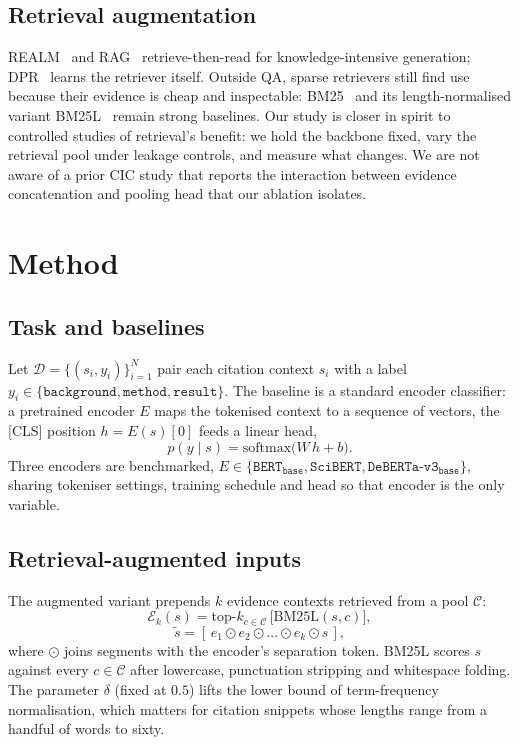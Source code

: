 \documentclass[10pt,twocolumn,twoside]{article}
\begin{document}
\subsection{Retrieval augmentation}
REALM~\cite{guu2020} and RAG~\cite{lewis2020} retrieve-then-read for
knowledge-intensive generation; DPR~\cite{karpukhin2020} learns the retriever
itself. Outside QA, sparse retrievers still find use because their evidence is
cheap and inspectable: BM25~\cite{robertson2009} and its length-normalised
variant BM25L~\cite{lv2011} remain strong baselines. Our study is closer in
spirit to controlled studies of retrieval's benefit: we hold the backbone
fixed, vary the retrieval pool under leakage controls, and measure what
changes. We are not aware of a prior CIC study that reports the interaction
between evidence concatenation and pooling head that our ablation isolates.

\section{Method}\label{sec:method}

\subsection{Task and baselines}\label{sec:task}
Let $\mathcal{D}=\{(s_i,y_i)\}_{i=1}^{N}$ pair each citation context $s_i$
with a label $y_i\in\{\texttt{background},\texttt{method},\texttt{result}\}$.
The baseline is a standard encoder classifier: a pretrained encoder $E$ maps
the tokenised context to a sequence of vectors, the \mbox{[CLS]} position
$h=E(s)[0]$ feeds a linear head,
\begin{equation}\label{eq:baseline}
p(y\mid s)=\mathrm{softmax}\big(W\,h+b\big).
\end{equation}
Three encoders are benchmarked, $E\in\{\texttt{BERT}_{\texttt{base}},
\texttt{SciBERT},\texttt{DeBERTa-v3}_{\texttt{base}}\}$, sharing tokeniser
settings, training schedule and head so that encoder is the only variable.

\subsection{Retrieval-augmented inputs}\label{sec:real}
The augmented variant prepends $k$ evidence contexts retrieved from a pool
$\mathcal{C}$:
\begin{equation}\label{eq:retrieve}
\mathcal{E}_k(s)=\mathrm{top}\text{-}k_{c\in\mathcal{C}}\,
\big[\mathrm{BM25L}(s,c)\big],
\end{equation}
\begin{equation}\label{eq:input}
\tilde{s}=[\,e_1\odot e_2\odot\dots\odot e_k\odot s\,],
\end{equation}
where $\odot$ joins segments with the encoder's separation token. BM25L
scores $s$ against every $c\in\mathcal{C}$ after lowercase, punctuation
stripping and whitespace folding. The parameter $\delta$ (fixed at $0.5$)
lifts the lower bound of term-frequency normalisation, which matters for
citation snippets whose lengths range from a handful of words to sixty.
\end{document}
